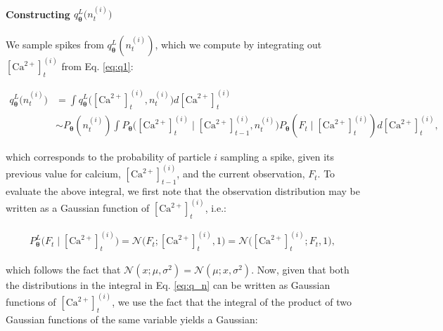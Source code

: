 \documentclass[10pt]{article}
\providecommand{\ve}[1]{\boldsymbol{#1}}
\providecommand{\ve}[1]{\boldsymbol{#1}}
\newcommand{\thetn}{\ve{\theta}}
\newcommand{\p}{P_{\thetn}}
\newcommand{\Ca}{[\text{Ca}^{2+}]}
\begin{document}
\paragraph{Constructing $q_{\thetn}^L\big(n_t^{(i)}\big)$}

We sample spikes from $q_{\thetn}^L(n_t^{(i)})$, which we compute by integrating out $\Ca_t^{(i)}$ from Eq. \ref{eq:q1}:

\begin{subequations}
\begin{align}
q_{\thetn}^L\big(n_t^{(i)}\big) &= \int q_{\thetn}^L\big(\Ca_t^{(i)}, n_t^{(i)}) d\Ca_t^{(i)}
\\ &\sim \p(n_t^{(i)}) \int \p \big( \Ca_t^{(i)} \mid \Ca^{(i)}_{t-1}, n_t^{(i)} \big) \p(F_t \mid \Ca_t^{(i)}) d\Ca_t^{(i)}, \label{eq:q_n}
\end{align}
\end{subequations}

%

\noindent which corresponds to the probability of particle $i$ sampling a spike, given its previous value for calcium, $\Ca_{t-1}^{(i)}$, and the current observation, $F_t$.  To evaluate the above integral, we first note that the observation distribution may be written as a Gaussian function of $\Ca_t^{(i)}$, i.e.:

\begin{align} \label{eq:obs_gauss}
\p^L \big(F_t \mid \Ca_t^{(i)}\big) = \mathcal{N}\big(F_t; \Ca_t^{(i)}, 1 \big) = \mathcal{N}\big(\Ca_t^{(i)}; F_t, 1\big),
\end{align}

\noindent which follows the fact that $\mathcal{N}(x;\mu,\sigma^2)=\mathcal{N}(\mu;x,\sigma^2)$. Now, given that both the distributions in the integral in Eq. \ref{eq:q_n} can be written as Gaussian functions of $\Ca_t^{(i)}$, we use the fact that the integral of the product of two Gaussian functions of the same variable yields a Gaussian:
\end{document}
